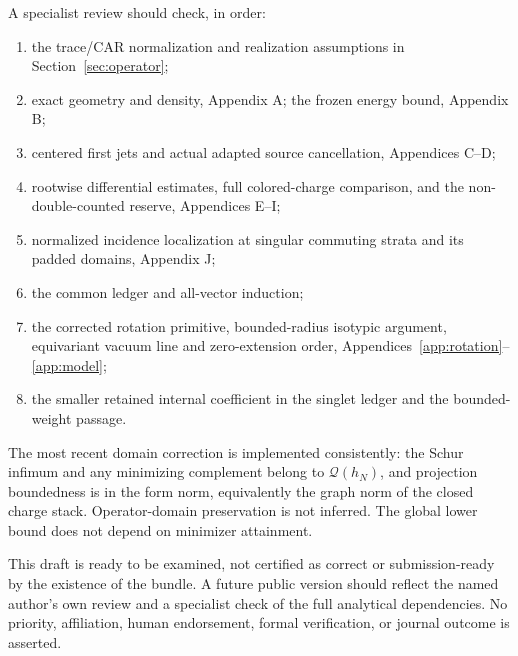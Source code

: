 \documentclass[11pt,letterpaper]{article}
\theoremstyle{definition}\newtheorem{hypothesis}[theorem]{Hypothesis}
\newcommand{\QQ}{\mathcal Q}
\numberwithin{equation}{section}
\begin{document}
A specialist review should check, in order:
\begin{enumerate}
\item the trace/CAR normalization and realization assumptions in Section~\ref{sec:operator};
\item exact geometry and density, Appendix A; the frozen energy bound, Appendix B;
\item centered first jets and actual adapted source cancellation, Appendices C--D;
\item rootwise differential estimates, full colored-charge comparison, and the non-double-counted reserve, Appendices E--I;
\item normalized incidence localization at singular commuting strata and its padded domains, Appendix J;
\item the common ledger and all-vector induction;
\item the corrected rotation primitive, bounded-radius isotypic argument, equivariant vacuum line and zero-extension order, Appendices~\ref{app:rotation}--\ref{app:model};
\item the smaller retained internal coefficient in the singlet ledger and the bounded-weight passage.
\end{enumerate}
The most recent domain correction is implemented consistently: the Schur infimum and any minimizing complement belong to $\QQ(h_N)$, and projection boundedness is in the form norm, equivalently the graph norm of the closed charge stack. Operator-domain preservation is not inferred. The global lower bound does not depend on minimizer attainment.

This draft is ready to be examined, not certified as correct or submission-ready by the existence of the bundle. A future public version should reflect the named author's own review and a specialist check of the full analytical dependencies. No priority, affiliation, human endorsement, formal verification, or journal outcome is asserted.
\end{document}
